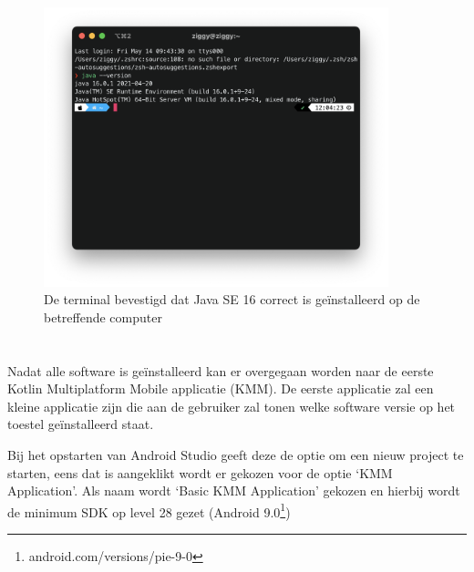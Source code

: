     \begin{figure}
        \centering
        \includegraphics[width=10cm]{img/jdk-version.png}
        \caption{De terminal bevestigd dat Java SE 16 correct is geïnstalleerd op de betreffende computer}
        \label{fig:M-jdk-version}
    \end{figure}

\section{}
\label{sec:M-first-app}
Nadat alle software is geïnstalleerd kan er overgegaan worden naar de eerste Kotlin Multiplatform Mobile applicatie (KMM). De eerste applicatie zal een kleine applicatie zijn die aan de gebruiker zal tonen welke software versie op het toestel geïnstalleerd staat. 

Bij het opstarten van Android Studio geeft deze de optie om een nieuw project te starten, eens dat is aangeklikt wordt er gekozen voor de optie `KMM Application'. Als naam wordt `Basic KMM Application' gekozen en hierbij wordt de minimum SDK op level 28 gezet (Android 9.0\footnote{android.com/versions/pie-9-0})

